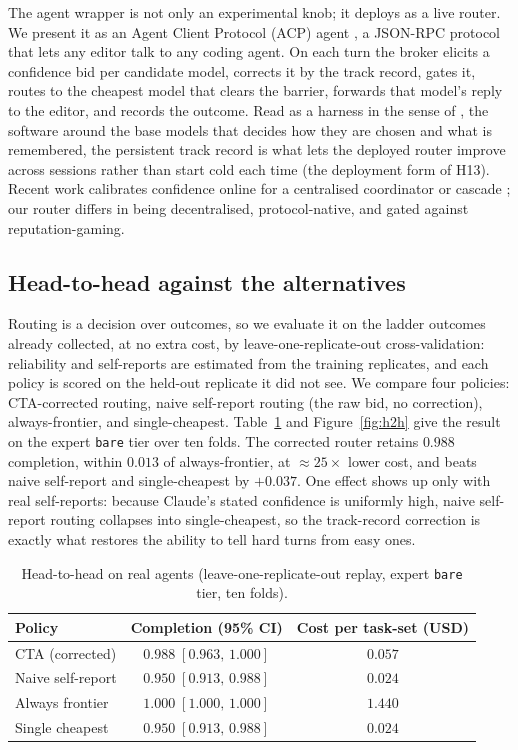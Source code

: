 \documentclass[11pt]{article}
\newcommand{\code}[1]{\texttt{#1}}
\begin{document}
The agent wrapper is not only an experimental knob; it deploys as a live router. We present it as an Agent Client Protocol (ACP) agent \citep{acp2025}, a JSON-RPC protocol that lets any editor talk to any coding agent. On each turn the broker elicits a confidence bid per candidate model, corrects it by the track record, gates it, routes to the cheapest model that clears the barrier, forwards that model's reply to the editor, and records the outcome. Read as a harness in the sense of \citet{weng2026harness}, the software around the base models that decides how they are chosen and what is remembered, the persistent track record is what lets the deployed router improve across sessions rather than start cold each time (the deployment form of H13). Recent work calibrates confidence online for a centralised coordinator or cascade \citep{armstrong2026margin,kotte2026ucci}; our router differs in being decentralised, protocol-native, and gated against reputation-gaming.

\subsection{Head-to-head against the alternatives}
Routing is a decision over outcomes, so we evaluate it on the ladder outcomes already collected, at no extra cost, by leave-one-replicate-out cross-validation: reliability and self-reports are estimated from the training replicates, and each policy is scored on the held-out replicate it did not see. We compare four policies: CTA-corrected routing, naive self-report routing (the raw bid, no correction), always-frontier, and single-cheapest. Table~\ref{tab:h2h} and Figure~\ref{fig:h2h} give the result on the expert \code{bare} tier over ten folds. The corrected router retains $0.988$ completion, within $0.013$ of always-frontier, at $\approx 25\times$ lower cost, and beats naive self-report and single-cheapest by $+0.037$. One effect shows up only with real self-reports: because Claude's stated confidence is uniformly high, naive self-report routing collapses into single-cheapest, so the track-record correction is exactly what restores the ability to tell hard turns from easy ones.

\begin{table}[t]
\centering\small
\caption{Head-to-head on real agents (leave-one-replicate-out replay, expert \code{bare} tier, ten folds).}
\label{tab:h2h}
\begin{tabular}{@{}lcc@{}}
\toprule
\textbf{Policy} & \textbf{Completion (95\% CI)} & \textbf{Cost per task-set (USD)} \\
\midrule
CTA (corrected) & $0.988\;[0.963,\,1.000]$ & $0.057$ \\
Naive self-report & $0.950\;[0.913,\,0.988]$ & $0.024$ \\
Always frontier & $1.000\;[1.000,\,1.000]$ & $1.440$ \\
Single cheapest & $0.950\;[0.913,\,0.988]$ & $0.024$ \\
\bottomrule
\end{tabular}
\end{table}
\end{document}
